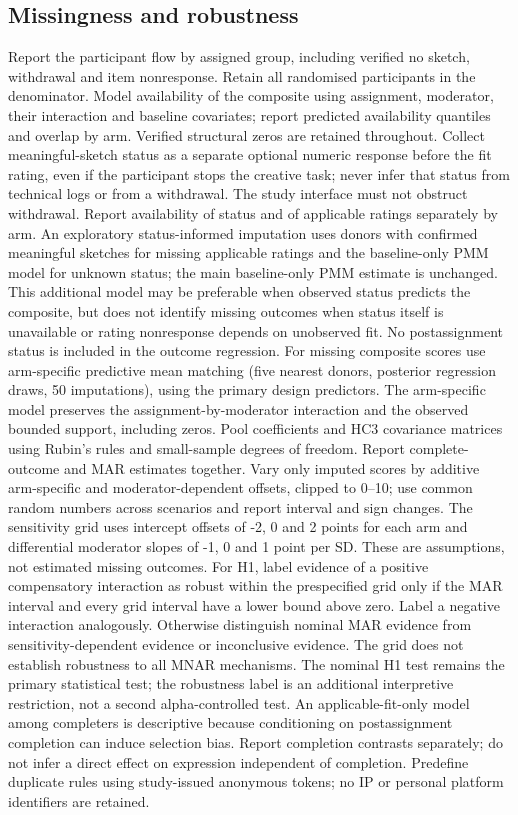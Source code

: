 \documentclass[11pt,a4paper]{article}
\begin{document}
\subsection{Missingness and robustness}
Report the participant flow by assigned group, including verified no sketch, withdrawal and item nonresponse. Retain all randomised participants in the denominator. Model availability of the composite using assignment, moderator, their interaction and baseline covariates; report predicted availability quantiles and overlap by arm. Verified structural zeros are retained throughout. Collect meaningful-sketch status as a separate optional numeric response before the fit rating, even if the participant stops the creative task; never infer that status from technical logs or from a withdrawal. The study interface must not obstruct withdrawal. Report availability of status and of applicable ratings separately by arm. An exploratory status-informed imputation uses donors with confirmed meaningful sketches for missing applicable ratings and the baseline-only PMM model for unknown status; the main baseline-only PMM estimate is unchanged. This additional model may be preferable when observed status predicts the composite, but does not identify missing outcomes when status itself is unavailable or rating nonresponse depends on unobserved fit. No postassignment status is included in the outcome regression. For missing composite scores use arm-specific predictive mean matching (five nearest donors, posterior regression draws, 50 imputations), using the primary design predictors. The arm-specific model preserves the assignment-by-moderator interaction and the observed bounded support, including zeros. Pool coefficients and HC3 covariance matrices using Rubin's rules and small-sample degrees of freedom. Report complete-outcome and MAR estimates together. Vary only imputed scores by additive arm-specific and moderator-dependent offsets, clipped to 0--10; use common random numbers across scenarios and report interval and sign changes. The sensitivity grid uses intercept offsets of -2, 0 and 2 points for each arm and differential moderator slopes of -1, 0 and 1 point per SD. These are assumptions, not estimated missing outcomes. For H1, label evidence of a positive compensatory interaction as robust within the prespecified grid only if the MAR interval and every grid interval have a lower bound above zero. Label a negative interaction analogously. Otherwise distinguish nominal MAR evidence from sensitivity-dependent evidence or inconclusive evidence. The grid does not establish robustness to all MNAR mechanisms. The nominal H1 test remains the primary statistical test; the robustness label is an additional interpretive restriction, not a second alpha-controlled test. An applicable-fit-only model among completers is descriptive because conditioning on postassignment completion can induce selection bias. Report completion contrasts separately; do not infer a direct effect on expression independent of completion. Predefine duplicate rules using study-issued anonymous tokens; no IP or personal platform identifiers are retained.
\end{document}
